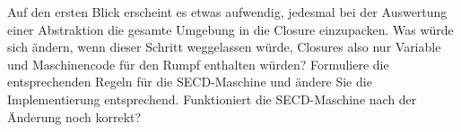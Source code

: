 \begin{aufgabe}
  Auf den ersten Blick erscheint es etwas aufwendig, jedesmal bei der
  Auswertung einer Abstraktion die gesamte Umgebung in die Closure
  einzupacken.  Was würde sich ändern, wenn dieser Schritt weggelassen
  würde, Closures also nur Variable und Maschinencode für den Rumpf
  enthalten würden?  Formuliere die entsprechenden Regeln für die
  SECD-Maschine und ändere Sie die Implementierung entsprechend.
  Funktioniert die SECD-Maschine nach der Änderung noch korrekt?
\end{aufgabe}


